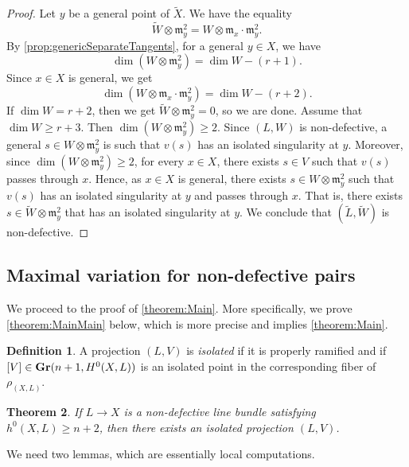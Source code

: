 \documentclass[11pt,reqno]{amsart}
\theoremstyle{plain}
\newtheorem{theorem}{Theorem}[section]
\theoremstyle{definition}
\newtheorem{definition}[theorem]{Definition}
\theoremstyle{remark}
\numberwithin{equation}{section}
\renewcommand{\to}{{\longrightarrow}}
\numberwithin{equation}{section}
\begin{document}
\begin{proof}
  Let $y$ be a general point of $\widetilde X$.
  We have the equality
  \[ \widetilde W \otimes \mathfrak m_y^2 = W \otimes \mathfrak m_x \cdot \mathfrak m_y^2. \]
  By \autoref{prop:genericSeparateTangents}, for a general $y \in X$, we have
  \[ \dim (W \otimes \mathfrak m_y^2) = \dim W - (r+1).\]
  Since $x \in X$ is general, we get
  \[ \dim (W \otimes \mathfrak m_x \cdot \mathfrak m_y^2) = \dim W - (r+2).\]
  If $\dim W = r+2$, then we get $\widetilde W \otimes \mathfrak m_y^2 = 0$, so we are done.
  Assume that $\dim W \geq r+3$.
  Then $\dim (W \otimes \mathfrak m_y^2) \geq 2$.
  Since $(L, W)$ is non-defective, a general $s \in W \otimes \mathfrak m_y^2$ is such that $v(s)$ has an isolated singularity at $y$.
  Moreover, since $\dim (W \otimes \mathfrak m_y^2) \geq 2$, for every $x \in X$, there exists $s \in V$ such that $v(s)$ passes through $x$.
  Hence, as $x \in X$ is general, there exists $s \in W \otimes \mathfrak m_y^2$ such that $v(s)$ has an isolated singularity at $y$ and passes through $x$.
  That is, there exists $s \in \widetilde W \otimes \mathfrak m_y^2 $ that has an isolated singularity at $y$.
  We conclude that $(\widetilde L, \widetilde W)$ is non-defective.
\end{proof}



\subsection{Maximal variation for non-defective pairs}


We proceed to the proof of \autoref{theorem:Main}. More specifically, we prove \autoref{theorem:MainMain} below, which is more precise and implies \autoref{theorem:Main}.


\begin{definition}
   A projection $(L,V)$ is {\sl isolated} if it is properly ramified and if $[V] \in {\bf Gr}(n+1,H^{0}(X,L))$ is an isolated point in the corresponding fiber of $\rho_{(X,L)}$.
\end{definition}



\begin{theorem}
  \label{theorem:MainMain}
  If $L \to X$ is a non-defective line bundle satisfying $h^{0}(X,L) \geq n+2$, then there exists an isolated projection $(L,V)$.
\end{theorem}

We need two lemmas, which are essentially local computations.
\end{document}
